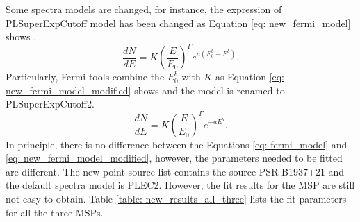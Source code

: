 \documentclass[a4paper, 12pt]{report}
\newcommand{\mycaption}[1]{\protect \caption{#1}}
\begin{document}
    Some spectra models are changed, for instance, the expression of PLSuperExpCutoff model 
    has been changed as Equation \ref{eq: new_fermi_model} shows \citep{newFermiModel}.
    \begin{equation}
      \frac{dN}{dE} = K\left(\frac{E}{E_0}\right)^{\Gamma} e^{a\left(E_0^b-E^b\right)} . 
      \label{eq: new_fermi_model}
    \end{equation}
    Particularly, Fermi tools combine the $E_0^b$ with $K$ as Equation 
    \ref{eq: new_fermi_model_modified} shows and the model is renamed to PLSuperExpCutoff2. 
    \begin{equation}
      \frac{dN}{dE} = K\left(\frac{E}{E_0}\right)^{\Gamma} e^{-aE^b} .
      \label{eq: new_fermi_model_modified}
    \end{equation}
    In principle, there is no difference between the Equations \ref{eq: fermi_model} and 
    \ref{eq: new_fermi_model_modified}, however, the parameters needed to be fitted are 
    different. The new point source list contains the source PSR B1937+21 and the default 
    spectra model is PLEC2. However, the fit results for the MSP are still not easy 
    to obtain. Table \ref{table: new_results_all_three} lists the fit parameters for all 
    the three MSPs.
\end{document}
